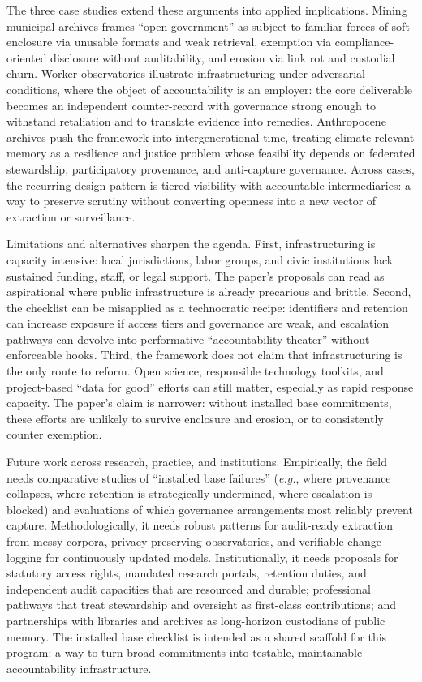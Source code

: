 \documentclass[acmsmall,screen]{acmart}
\begin{document}
The three case studies extend these arguments into applied implications. Mining municipal archives frames ``open government'' as subject to familiar forces of soft enclosure via unusable formats and weak retrieval, exemption via compliance-oriented disclosure without auditability, and erosion via link rot and custodial churn. Worker observatories illustrate infrastructuring under adversarial conditions, where the object of accountability is an employer: the core deliverable becomes an independent counter-record with governance strong enough to withstand retaliation and to translate evidence into remedies. Anthropocene archives push the framework into intergenerational time, treating climate-relevant memory as a resilience and justice problem whose feasibility depends on federated stewardship, participatory provenance, and anti-capture governance. Across cases, the recurring design pattern is tiered visibility with accountable intermediaries: a way to preserve scrutiny without converting openness into a new vector of extraction or surveillance.

Limitations and alternatives sharpen the agenda. First, infrastructuring is capacity intensive: local jurisdictions, labor groups, and civic institutions lack sustained funding, staff, or legal support. The paper's proposals can read as aspirational where public infrastructure is already precarious and brittle. Second, the checklist can be misapplied as a technocratic recipe: identifiers and retention can increase exposure if access tiers and governance are weak, and escalation pathways can devolve into performative ``accountability theater'' without enforceable hooks. Third, the framework does not claim that infrastructuring is the only route to reform. Open science, responsible technology toolkits, and project-based ``data for good'' efforts can still matter, especially as rapid response capacity. The paper's claim is narrower: without installed base commitments, these efforts are unlikely to survive enclosure and erosion, or to consistently counter exemption.

Future work across research, practice, and institutions. Empirically, the field needs comparative studies of ``installed base failures'' (\textit{e.g.}, where provenance collapses, where retention is strategically undermined, where escalation is blocked) and evaluations of which governance arrangements most reliably prevent capture. Methodologically, it needs robust patterns for audit-ready extraction from messy corpora, privacy-preserving observatories, and verifiable change-logging for continuously updated models. Institutionally, it needs proposals for statutory access rights, mandated research portals, retention duties, and independent audit capacities that are resourced and durable; professional pathways that treat stewardship and oversight as first-class contributions; and partnerships with libraries and archives as long-horizon custodians of public memory. The installed base checklist is intended as a shared scaffold for this program: a way to turn broad commitments into testable, maintainable accountability infrastructure.
\end{document}
